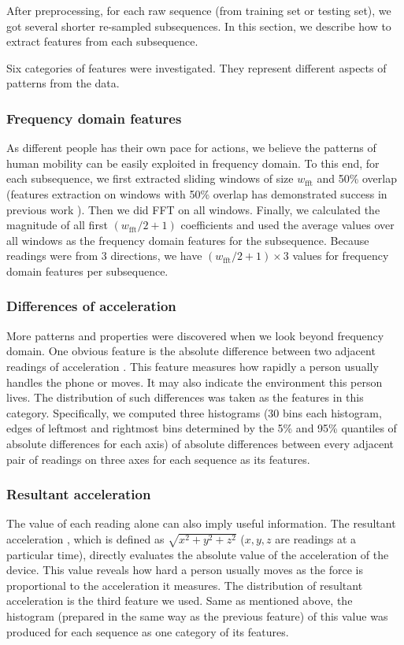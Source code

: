 \documentclass{article} %
\begin{document}
After preprocessing, for each raw sequence (from training set or testing set), we got several shorter re-sampled subsequences. In this section, we describe how to extract features from each subsequence.
	
Six categories of features were investigated. They represent different aspects of patterns from the data.

\subsubsection{Frequency domain features}
As different people has their own pace for actions, we believe the patterns of human mobility can be easily exploited in frequency domain. To this end, for each subsequence, we first extracted sliding windows of size $w_\mathrm{fft}$ and 50\% overlap (features extraction on windows with 50\% overlap has demonstrated success in previous work \cite{Bao:PC2004}). Then we did FFT on all windows. Finally, we calculated the magnitude of all first $(w_\mathrm{fft}/2 + 1)$ coefficients and used the average values over all windows as the frequency domain features for the subsequence. Because readings were from 3 directions, we have $(w_\mathrm{fft}/2 + 1)\times 3$ values for frequency domain features per subsequence.

\subsubsection{Differences of acceleration}
More patterns and properties were discovered when we look beyond frequency domain. One obvious feature is the absolute difference between two adjacent readings of acceleration \cite{Kwapisz:BTAS2009}. This feature measures how rapidly a person usually handles the phone or moves. It may also indicate the environment this person lives. The distribution of such differences was taken as the features in this category. Specifically, we computed three histograms (30 bins each histogram, edges of leftmost and rightmost bins determined by the 5\% and 95\% quantiles of absolute differences for each axis) of absolute differences between every adjacent pair of readings on three axes for each sequence as its features. 

\subsubsection{Resultant acceleration}
The value of each reading alone can also imply useful information. The resultant acceleration \cite{Kwapisz:BTAS2009}, which is defined as $\sqrt{x^2+y^2+z^2}$ ($x,y,z$ are readings at a particular time), directly evaluates the absolute value of the acceleration of the device. This value reveals how hard a person usually moves as the force is proportional to the acceleration it measures. The distribution of resultant acceleration is the third feature we used. Same as mentioned above, the histogram (prepared in the same way as the previous feature) of this value was produced for each sequence as one category of its features.
\end{document}
